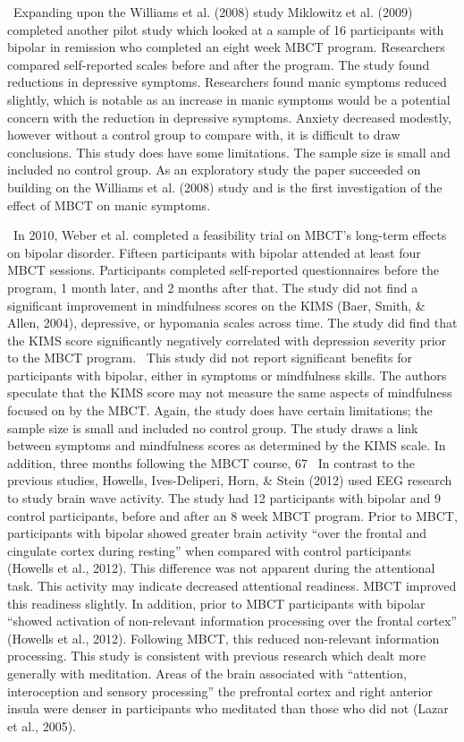  Expanding upon the Williams et al. (2008) study Miklowitz et al. (2009) completed another pilot study which looked at a sample of 16 participants with bipolar in remission who completed an eight week MBCT program. Researchers compared self-reported scales before and after the program. The study found reductions in depressive symptoms. Researchers found manic symptoms reduced slightly, which is notable as an increase in manic symptoms would be a potential concern with the reduction in depressive symptoms. Anxiety decreased modestly, however without a control group to compare with, it is difficult to draw conclusions. This study does have some limitations. The sample size is small and included no control group. As an exploratory study the paper succeeded on building on the Williams et al. (2008) study and is the first investigation of the effect of MBCT on manic symptoms.

 In 2010, Weber et al. completed a feasibility trial on MBCT’s long-term effects on bipolar disorder. Fifteen participants with bipolar attended at least four MBCT sessions. Participants completed self-reported questionnaires before the program, 1 month later, and 2 months after that. The study did not find a significant improvement in mindfulness scores on the KIMS (Baer, Smith, & Allen, 2004), depressive, or hypomania scales across time. The study did find that the KIMS score significantly negatively correlated with depression severity prior to the MBCT program.
 This study did not report significant benefits for participants with bipolar, either in symptoms or mindfulness skills. The authors speculate that the KIMS score may not measure the same aspects of mindfulness focused on by the MBCT. Again, the study does have certain limitations; the sample size is small and included no control group. The study draws a link between symptoms and mindfulness scores as determined by the KIMS scale. In addition, three months following the MBCT course, 67%
 In contrast to the previous studies, Howells, Ives-Deliperi, Horn, & Stein (2012) used EEG research to study brain wave activity. The study had 12 participants with bipolar and 9 control participants, before and after an 8 week MBCT program. Prior to MBCT, participants with bipolar showed greater brain activity “over the frontal and cingulate cortex during resting” when compared with control participants (Howells et al., 2012). This difference was not apparent during the attentional task. This activity may indicate decreased attentional readiness. MBCT improved this readiness slightly. In addition, prior to MBCT participants with bipolar “showed activation of non-relevant information processing over the frontal cortex” (Howells et al., 2012). Following MBCT, this reduced non-relevant information processing. This study is consistent with previous research which dealt more generally with meditation. Areas of the brain associated with “attention, interoception and sensory processing” the prefrontal cortex and right anterior insula were denser in participants who meditated than those who did not (Lazar et al., 2005).

